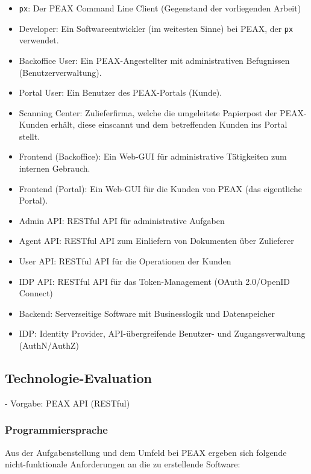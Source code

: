 \begin{itemize}
	\item \texttt{px}: Der PEAX Command Line Client (Gegenstand der vorliegenden Arbeit)
	\item Developer: Ein Softwareentwickler (im weitesten Sinne) bei PEAX, der \texttt{px} verwendet.
	\item Backoffice User: Ein PEAX-Angestellter mit administrativen Befugnissen (Benutzerverwaltung).
	\item Portal User: Ein Benutzer des PEAX-Portals (Kunde).
	\item Scanning Center: Zulieferfirma, welche die umgeleitete Papierpost der PEAX-Kunden erhält, diese einscannt und dem betreffenden Kunden ins Portal stellt.
	\item Frontend (Backoffice): Ein Web-GUI für administrative Tätigkeiten zum internen Gebrauch.
	\item Frontend (Portal): Ein Web-GUI für die Kunden von PEAX (das eigentliche Portal).
	\item Admin API: RESTful API für administrative Aufgaben
	\item Agent API: RESTful API zum Einliefern von Dokumenten über Zulieferer
	\item User API: RESTful API für die Operationen der Kunden
	\item IDP API: RESTful API für das Token-Management (OAuth 2.0/OpenID Connect)
	\item Backend: Serverseitige Software mit Businesslogik und Datenspeicher
	\item IDP: Identity Provider, API-übergreifende Benutzer- und Zugangsverwaltung (AuthN/AuthZ)
\end{itemize}

\subsection{Technologie-Evaluation}

- Vorgabe: PEAX API (RESTful)

\subsubsection{Programmiersprache}

Aus der Aufgabenstellung und dem Umfeld bei PEAX ergeben sich folgende nicht-funktionale Anforderungen an die zu erstellende Software:


